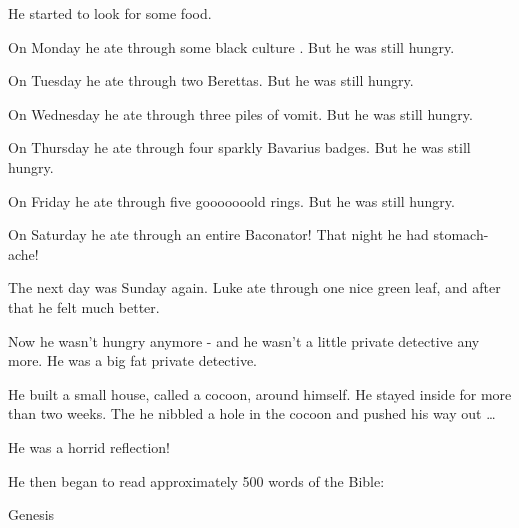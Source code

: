 He started to look for some food.



On Monday he ate through some black culture . But he was still
hungry.



On Tuesday he ate through two Berettas. But he was still
hungry.



On Wednesday he ate through three piles of vomit. But he was still
hungry.



On Thursday he ate through four sparkly Bavarius badges. But he was
still hungry.



On Friday he ate through five gooooooold rings. But he was still
hungry.



On Saturday he ate through an entire Baconator! That night he had
stomach-ache!



The next day was Sunday again. Luke ate through one nice green
leaf, and after that he felt much better.



Now he wasn't hungry anymore - and he wasn't a little private
detective any more. He was a big fat private detective.



He built a small house, called a cocoon, around himself. He stayed
inside for more than two weeks. The he nibbled a hole in the cocoon
and pushed his way out {\ldots}



He was a horrid reflection!



He then began to read approximately 500 words of the Bible:



Genesis



